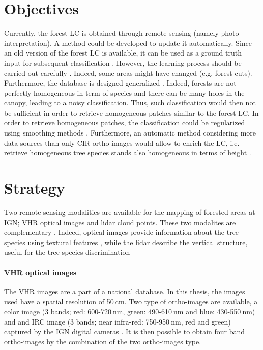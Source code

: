 \section{Objectives}
Currently, the forest LC is obtained through remote sensing (namely photo-inter\-pretation). A method could be developed to update it automatically. Since an old version of the forest LC is available, it can be used as a ground truth input for subsequent classification \citep{gressin2013updating}. However, the learning process should be carried out carefully \citep{gressin2014updating}. Indeed, some areas might have changed (e.g. forest cuts). Furthermore, the database is designed generalized \citep{smith1977database}. Indeed, forests are not perfectly homogeneous in term of species and there can be many holes in the canopy, leading to a noisy classification. Thus, such classification would then not be sufficient in order to retrieve homogeneous patches similar to the forest LC. In order to retrieve homogeneous patches, the classification could be regularized using smoothing methods \citep{schindler2012overview}. Furthermore, an automatic method considering more data sources than only CIR ortho-images would allow to enrich the LC, i.e. retrieve homogeneous tree species stands also homogeneous in terms of height \citep{gressin2014unified}.

\section{Strategy}
Two remote sensing modalities are available for the mapping of forested areas at IGN; VHR optical images and lidar cloud points. These two modalites are complementary \citep{torabzadeh2014fusion}. Indeed, optical images provide information about the tree species using textural features \citep{franklin2000incorporating}, while the lidar describe the vertical structure, useful for the tree species discrimination \citep{dalponte2012tree, dalponte2014tree}

\paragraph{VHR optical images \\}
The VHR images are a part of a national database. In this thesis, the images used have a spatial resolution of 50$\:$cm. Two type of ortho-images are available, a color image (3 bands; red: 600-720$\:$nm, green: 490-610$\:$nm and blue: 430-550$\:$nm) and and IRC image (3 bands; near infra-red: 750-950$\:$nm, red and green) captured by the IGN digital cameras \citep{souchon2012large}. It is then possible to obtain four band ortho-images by the combination of the two ortho-images type. \\
